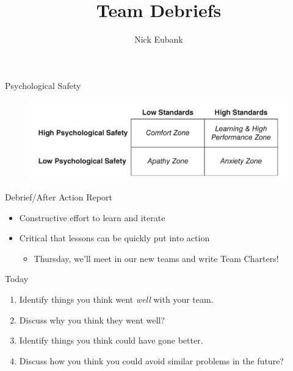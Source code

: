 \documentclass[11pt]{beamer}
\title{Team Debriefs}
\author{\small Nick Eubank}
\date{\vspace*{.3in} \date}
\begin{document}
\begin{frame}[c]
\maketitle
\end{frame}

\begin{frame}[c]{Psychological Safety}
\begin{figure}
    \includegraphics[width=\textwidth]{team_types.png}
\end{figure}
\end{frame}


\begin{frame}[c]{Debrief/After Action Report}
    \begin{itemize}
        \item Constructive effort to learn and iterate
        \item Critical that lessons can be quickly put into action
        \begin{itemize}
            \item Thursday, we'll meet in our new teams and write Team Charters!
        \end{itemize}
    \end{itemize}
\end{frame}

\begin{frame}[c]{Today}
\begin{enumerate}
    \item Identify things you think went \emph{well} with your team. 
    \item Discuss \alert{why} you think they went well?
    \item Identify things you think could have gone better.
    \item Discuss \alert{how} you think you could avoid similar problems in the future?
\end{enumerate}
\end{frame}
\end{document}
